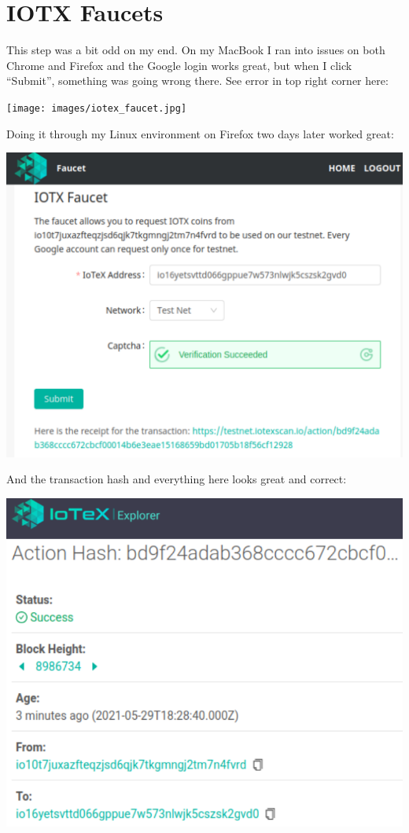 \documentclass[
]{book}
\begin{document}
\hypertarget{iotx-faucets}{%
\section{IOTX Faucets}\label{iotx-faucets}}

This step was a bit odd on my end. On my MacBook I ran into issues on
both Chrome and Firefox and the Google login works great, but when I
click ``Submit'', something was going wrong there. See error in top
right corner here:

\texttt{[image: images/iotex\_faucet.jpg]}

Doing it through my Linux environment on Firefox two days later worked
great:

\includegraphics{images/iotx_faucet.PNG}

And the transaction hash and everything here looks great and correct:

\includegraphics{images/transaction_explorer.PNG}
\end{document}
